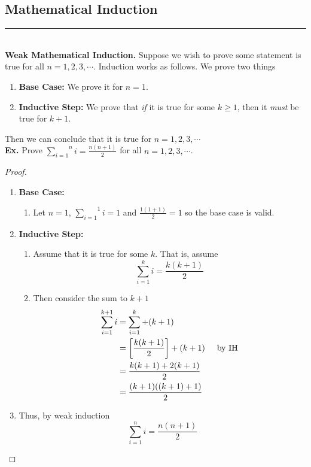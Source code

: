 \documentclass[class=article, crop=false]{standalone}
\def\inlinesum#1#2{\overset{#2}{\underset{#1}{\sum}}}
\begin{document}
\subsection{Mathematical Induction}
\rule{\textwidth}{1pt}\\
\textbf{Weak Mathematical Induction.} Suppose we wish to prove some statement is true for all $n=1,2,3,\cdots$.
Induction works as follows. We prove two things
\begin{enumerate}[1.]
	\item \textbf{Base Case:} We prove it for $n=1$.
	\item \textbf{Inductive Step:} We prove that \emph{if} it is true for some $k\geq 1$, then it \emph{must} be true for $k+1$.
\end{enumerate}
Then we can conclude that it is true for $n=1,2,3,\cdots$\\
\textbf{Ex.} Prove $\inlinesum{i=1}{n}i = \frac{n(n+1)}{2}$ for all $n=1,2,3,\cdots$.
\begin{proof}
	$ $\\
	\begin{enumerate}
		\item[] \textbf{Base Case:} 
			\begin{enumerate}
				\item[] Let $n=1$, $\inlinesum{i=1}{1} i = 1$ and $\frac{1(1+1)}{2}=1$ so the base case is valid.
			\end{enumerate}
		\item[] \textbf{Inductive Step:}
			\begin{enumerate}
				\item[] Assume that it is true for some $k$. That is, assume $$\sum_{i=1}^{k} i = \frac{k(k+1)}{2}$$
				\item[] Then consider the sum to $k+1$
					\begin{align*}
						\sum_{i=1}^{k+1} i &= \sum_{i=1}^{k} + (k+1) \\
						&= \left[\frac{k(k+1)}{2}\right] + (k+1) \hspace{5mm}\text{by IH} \\
						&= \frac{k(k+1) + 2(k+1)}{2} \\
						&= \frac{(k+1)((k+1)+1)}{2}
					\end{align*}
			\end{enumerate}
		\item[] Thus, by weak induction $$\inlinesum{i=1}{n}i = \frac{n(n+1)}{2}$$
	\end{enumerate}
\end{proof}
\end{document}
